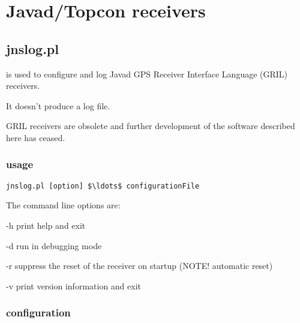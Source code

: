 \section{Javad/Topcon receivers}

\subsection{jnslog.pl}
\hypertarget{h:jnslog}{}

 is used to configure and log Javad 
GPS Receiver Interface Language (GRIL) receivers.

It doesn't produce a log file.

GRIL receivers are obsolete and further development of the software
described here has ceased.

\subsubsection{usage}

\begin{lstlisting}[mathescape=true]
jnslog.pl [option] $\ldots$ configurationFile
\end{lstlisting}

The command line options are:
\begin{description*}
 \item[-h] print help and exit
 \item[-d] run in debugging mode
 \item[-r] suppress the reset of the receiver on startup (NOTE! automatic reset)
 \item[-v] print version information and exit
\end{description*}

\subsubsection{configuration}

